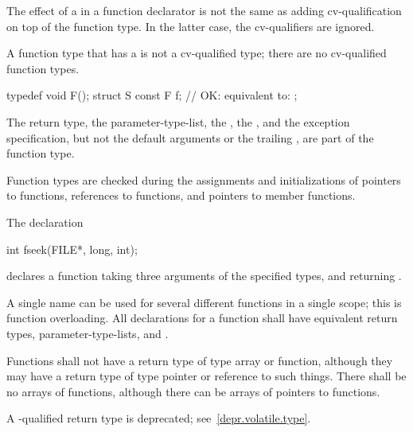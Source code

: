 \pnum
The effect of a
in a function declarator is not the same as
adding cv-qualification on top of the function type.
In the latter case, the cv-qualifiers are ignored.
\begin{note}
A function type that has a  is not a
cv-qualified type; there are no cv-qualified function types.
\end{note}
\begin{example}
\begin{codeblock}
typedef void F();
struct S {
  const F f;        // OK: equivalent to: 
};
\end{codeblock}
\end{example}

\pnum
The return type, the parameter-type-list, the ,
the , and
the exception specification,
but not the default arguments
or the trailing ,
are part of the function type.
\begin{note}
Function types are checked during the assignments and initializations of
pointers to functions, references to functions, and pointers to member functions.
\end{note}

\pnum
\begin{example}
The declaration
\begin{codeblock}
int fseek(FILE*, long, int);
\end{codeblock}
declares a function taking three arguments of the specified types,
and returning
.
\end{example}

\pnum
{}%
A single name can be used for several different functions in a single scope;
this is function overloading.
All declarations for a function shall have equivalent return types,
parameter-type-lists, and .

\pnum
{}%
%
Functions shall not have a return type of type array or function,
although they may have a return type of type pointer or reference to such things.
There shall be no arrays of functions, although there can be arrays of pointers
to functions.

\pnum
A -qualified return type is deprecated;
see~\ref{depr.volatile.type}.

